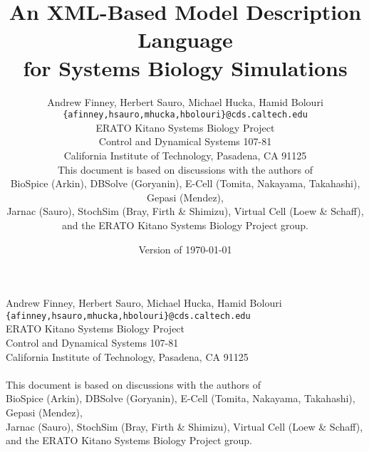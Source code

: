 \documentclass[10pt]{cek-article}
\begin{document}

\title{An XML-Based Model Description Language\\
    for Systems Biology Simulations}


\begin{latexonly}
  \author{Andrew Finney, Herbert Sauro, Michael Hucka, Hamid Bolouri\\[-2 pt]
    \normalsize\texttt{\{afinney,hsauro,mhucka,hbolouri\}@cds.caltech.edu}\\[-4pt]
    \normalsize ERATO Kitano Systems Biology Project\\[-4pt]
    \normalsize Control and Dynamical Systems 107-81\\[-4pt]
    \normalsize California Institute of Technology, Pasadena, CA 91125\\[4pt]
    \normalsize This document is based on discussions with the authors of\\[-4pt]
    \normalsize BioSpice (Arkin), DBSolve (Goryanin), E-Cell (Tomita, Nakayama, Takahashi), Gepasi (Mendez),\\[-4pt]
    \normalsize Jarnac (Sauro), StochSim (Bray, Firth \& Shimizu), Virtual Cell (Loew \& Schaff),\\[-4pt]
    \normalsize and the ERATO Kitano Systems Biology Project group.}
\end{latexonly}

\date{Version of \today{}}

\maketitle

\begin{htmlonly}
\begin{center}
  Andrew Finney, Herbert Sauro, Michael Hucka, Hamid Bolouri\\
  \texttt{\{afinney,hsauro,mhucka,hbolouri\}@cds.caltech.edu}\\
  ERATO Kitano Systems Biology Project\\
  Control and Dynamical Systems 107-81\\
  California Institute of Technology, Pasadena, CA 91125\\
  \\
  This document is based on discussions with the authors of\\
  BioSpice (Arkin), DBSolve (Goryanin), E-Cell (Tomita, Nakayama, Takahashi), Gepasi (Mendez),\\
  Jarnac (Sauro), StochSim (Bray, Firth \& Shimizu), Virtual Cell (Loew \& Schaff),\\
  and the ERATO Kitano Systems Biology Project group.
\end{center}
\end{htmlonly}
\end{document}
